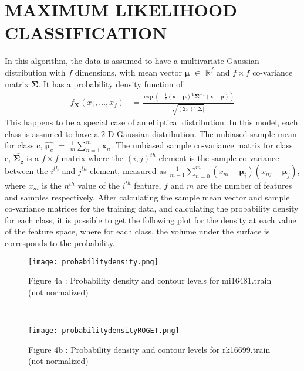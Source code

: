 \section{\label{sec:level5}MAXIMUM LIKELIHOOD CLASSIFICATION}
In this algorithm, the data is assumed to have a multivariate Gaussian distribution with $f$ dimensions, with mean vector $\bm{\mu}$ $\in$ $\mathbb{R}^{f}$ and $f \times f$ co-variance matrix $\bm{\Sigma}$. It has a probability density function of 
\begin{align}
f_{\mathbf X}(x_1,\ldots,x_f)
& = \frac{\exp\left(-\frac 1 2 ({\mathbf x}-{\boldsymbol\mu})^\mathrm{T}{\boldsymbol\Sigma}^{-1}({\mathbf x}-{\boldsymbol\mu})\right)}{\sqrt{(2\pi)^f|\boldsymbol\Sigma|}}
\end{align}
This happens to be a special case of an elliptical distribution.\cite{ellipticdistro}
In this model, each class is assumed to have a 2-D Gaussian distribution. The unbiased sample mean for class c, $\widehat{\bm{\mu}_{c}}$ $=$ $\frac{1}{m}\sum_{n=1}^{m} \bm{x}_{n}$. The unbiased sample co-variance matrix for class c, $\widehat{\bm{\Sigma_{c}}}$ is a $f \times f$ matrix where the $(i,j)^{th}$ element is the sample co-variance between the $i^{th}$ and $j^{th}$ element, measured as $\frac{1}{m-1} \sum_{n=0}^{m} (x_{ni} - \bm{\mu}_{i})(x_{nj} - \bm{\mu}_{j})$, where $x_{ni}$ is
the $n^{th}$ value of the $i^{th}$ feature, $f$ and $m$ are the number of features and samples respectively. After calculating the sample mean vector and sample co-variance matrices for the training data, and calculating the probability density for each class, it is possible to get the following plot for the density at each value of the feature space, where for each class, the volume under the surface is corresponds to the probability.
\begin{wrapfigure}{}{\textwidth}
  \begin{center}
      \texttt{[image: probabilitydensity.png]}
          \caption{Figure 4a : Probability density and contour levels for mi16481.train (not normalized)}
           \end{center}
           \end{wrapfigure}
           \\\begin{wrapfigure}{}{\textwidth}
             \begin{center}
                 \texttt{[image: probabilitydensityROGET.png]}
                     \caption{Figure 4b : Probability density and contour levels for rk16699.train (not normalized)}
                      \end{center}
                      \end{wrapfigure}

